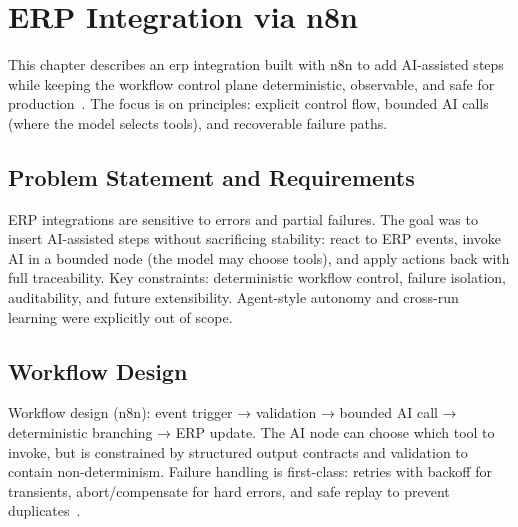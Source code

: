 \chapter{ERP Integration via n8n}
\label{ch:Task1_n8n}

This chapter describes an \gls{erp} integration built with \gls{n8n} to add
AI-assisted steps while keeping the workflow control plane deterministic,
observable, and safe for production~\cite{n8nDocs}. The focus is on
principles: explicit control flow, bounded AI calls (where the model selects
tools), and recoverable failure paths.

\section{Problem Statement and Requirements}
\label{sec:Task1_Problem}

ERP integrations are sensitive to errors and partial failures. The goal was to
insert AI-assisted steps without sacrificing stability: react to ERP events,
invoke AI in a bounded node (the model may choose tools), and apply actions
back with full traceability. Key constraints: deterministic workflow control,
failure isolation, auditability, and future extensibility. Agent-style
autonomy and cross-run learning were explicitly out of scope.

\section{Workflow Design}
\label{sec:Task1_WorkflowDesign}

Workflow design (n8n): event trigger → validation → bounded AI call →
deterministic branching → ERP update. The AI node can choose which tool to
invoke, but is constrained by structured output contracts and validation to
contain non-determinism. Failure handling is first-class: retries with backoff
for transients, abort/compensate for hard errors, and safe replay to prevent
duplicates~\cite{googleSRE}.

